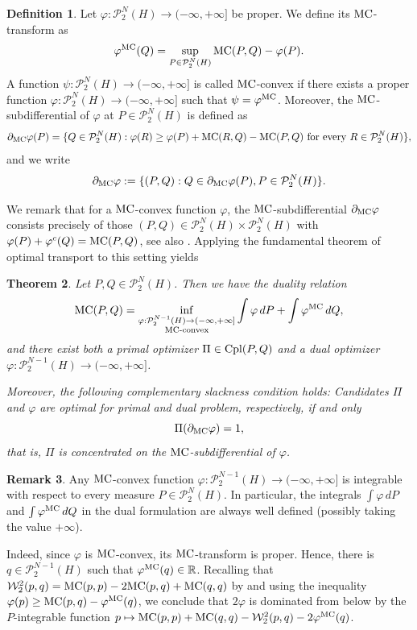 \documentclass[a4paper]{amsart}
\newtheorem{theorem}{Theorem}
\numberwithin{theorem}{section}
\theoremstyle{definition}
\newtheorem{definition}[theorem]{Definition}
\newtheorem{remark}[theorem]{Remark}
\newcommand{\R}{\mathbb{R}}
\newcommand{\cpl}{\textup{Cpl}}
\newcommand{\W}{\mathcal{W}}
\newcommand{\Pc}{\mathcal P}
\renewcommand{\H}{H}
\renewcommand{\phi}{\varphi}
\newcommand{\mc}{\textup{MC}}
\begin{document}
\begin{definition}\label{def:MC_subdiff_ad}
    Let $\phi : \Pc_2^N(\H) \to (-\infty,+\infty]$ be proper. We define its $\mc$-transform as 
    \[
        \phi^{\mc}(Q) = \sup_{ P \in \Pc_2^N(\H)}  \mc(P,Q) -  \phi(P). 
    \]
    A function $\psi : \Pc_2^N(\H) \to (-\infty,+\infty]$ is called $\mc$-convex if there exists a proper function $\phi : \Pc_2^N(\H) \to (-\infty,+\infty]$ such that $\psi = \phi^\mc$.
    Moreover, the $\mc$-subdifferential of $\phi$ at $P \in \Pc_2^N(H)$ is defined as  
    \[
        \partial_{\mc} \phi(P) = \{ Q\in \Pc_2^N(\H) : \phi(R) \ge \phi(P) + \mc(R,Q) - \mc(P,Q) \text{ for every } R \in \Pc_2^N(\H)\},
    \]
    and we write
    \[
        \partial_\mc \phi := \{ (P,Q) : Q \in  \partial_{\mc} \phi(P), P \in \Pc_2^N(\H) \}. 
    \]
\end{definition}

We remark that for a $\mc$-convex function $\phi$, the $\mc$-subdifferential $\partial_\mc \phi$ consists precisely of those $(P,Q) \in \Pc_2^N(H) \times \Pc_2^N(H)$ with $\phi(P) + \phi^c(Q) = \mc(P,Q)$, see also \cite[Definition 5.2]{Vi09}.
Applying the fundamental theorem of optimal transport
to this setting yields
\begin{theorem}\label{thm:ftot.mc}
Let $P,Q \in \Pc_2^N(\H)$. Then we have the  duality relation 
\[
\mc(P,Q) = \inf_{ \substack{ \phi : \Pc_2^{N-1}(\H) \to (-\infty,+\infty] \\ \text{$\mc$-convex} } } \int \phi \,dP + \int \phi^{\mc} \, dQ,
\]
and there exist both a primal optimizer $\Pi \in \cpl(P,Q)$ and a dual optimizer $\phi : \Pc_2^{N-1}(\H) \to (-\infty,+\infty]$.  

Moreover, the following complementary slackness condition holds: Candidates $\Pi$ and $\phi$ are optimal for primal and dual problem, respectively, if and only \[ \Pi(\partial_\mc \phi) =1, \]
that is, $\Pi$ is concentrated on the $\mc$-subdifferential of $\phi$.
\end{theorem}

\begin{remark}
    Any $\mc$-convex function 
    $\phi : \Pc_2^{N-1}(\H) \to (-\infty,+\infty]$ 
    is integrable with respect to every measure 
    $P \in \Pc_2^N(\H)$.  
    In particular, the integrals 
    $\int \phi \, dP$ and $\int \phi^{\mc} \, dQ$ 
    in the dual formulation are always well defined 
    (possibly taking the value $+\infty$).
    
    Indeed, since $\phi$ is $\mc$-convex, its $\mc$-transform is proper.
    Hence, there is $q \in \Pc_2^{N-1}(H)$ such that $\phi^\mc(q) \in \R$.
    Recalling that $\W_2^2(p,q) = \mc(p,p) - 2 \mc(p,q) + \mc(q,q)$ by  and using the inequality $\phi(p) \ge \mc(p,q) - \phi^\mc(q)$, we conclude that $2 \phi$ is dominated from below by the $P$-integrable function $p \mapsto \mc(p,p) + \mc(q,q) - \W_2^2(p,q) - 2 \phi^\mc(q)$.
\end{remark}
\end{document}
